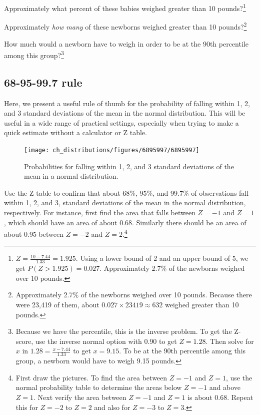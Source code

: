 \begin{exercise}Approximately what percent of these babies weighed greater than 10 pounds?\footnote{$Z=\frac{10-7.44}{1.33}=1.925$. Using a lower bound of 2 and an upper bound of 5, we get $P(Z > 1.925) = 0.027$. Approximately 2.7\% of the newborns weighed over 10 pounds.}
\end{exercise}

\begin{exercise}Approximately \emph{how many} of these newborns weighed greater than 10 pounds?\footnote{Approximately 2.7\% of the newborns weighed over 10 pounds. Because there were 23,419 of them, about $0.027 \times 23419 \approx 632$ weighed greater than 10 pounds.}
\end{exercise}

\begin{exercise}How much would a newborn have to weigh in order to be at the 90th percentile among this group?\footnote{Because we have the percentile, this is the inverse problem. To get the Z-score, use the inverse normal option with 0.90 to get $Z = 1.28$. Then solve for $x$ in $1.28 = \frac{x - 7.44}{1.33}$ to get $x = 9.15$. To be at the 90th percentile among this group, a newborn would have to weigh 9.15 pounds.}
\end{exercise}


\subsection{68-95-99.7 rule}

Here, we present a useful rule of thumb for the probability of falling within 1, 2, and 3 standard deviations of the mean in the normal distribution. This will be useful in a wide range of practical settings, especially when trying to make a quick estimate without a calculator or Z table.

\begin{figure}[hht]
\centering
\texttt{[image: ch\_distributions/figures/6895997/6895997]}
\caption{Probabilities for falling within 1, 2, and 3 standard deviations of the mean in a normal distribution.}
\label{6895997}
\end{figure}

\begin{exercise}
Use the Z table to confirm that about 68\%, 95\%, and 99.7\% of observations fall within 1, 2, and 3, standard deviations of the mean in the normal distribution, respectively. For instance, first find the area that falls between $Z=-1$ and $Z=1$, which should have an area of about 0.68. Similarly there should be an area of about 0.95 between $Z=-2$ and $Z=2$.\footnote{First draw the pictures. To find the area between $Z=-1$ and $Z=1$, use the normal probability table to determine the areas below $Z=-1$ and above $Z=1$. Next verify the area between $Z=-1$ and $Z=1$ is about 0.68. Repeat this for $Z=-2$ to $Z=2$ and also for $Z=-3$ to $Z=3$.}
\end{exercise}

